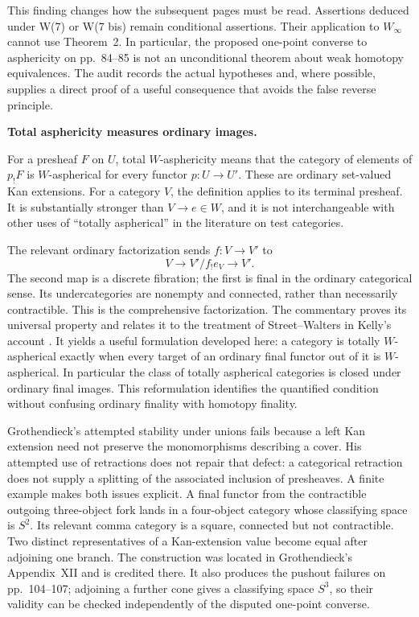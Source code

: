 This finding changes how the subsequent pages must be read. Assertions deduced under W(7) or W(7 bis) remain conditional assertions. Their application to $W_\infty$ cannot use Theorem~2. In particular, the proposed one-point converse to asphericity on pp.~84--85 is not an unconditional theorem about weak homotopy equivalences. The audit records the actual hypotheses and, where possible, supplies a direct proof of a useful consequence that avoids the false reverse principle.

\medskip
{}
\noindent\textbf{Total asphericity measures ordinary images.}

For a presheaf $F$ on $U$, total $W$-asphericity means that the category of elements of $p_!F$ is $W$-aspherical for every functor $p:U\to U'$. These are ordinary set-valued Kan extensions. For a category $V$, the definition applies to its terminal presheaf. It is substantially stronger than $V\to e\in W$, and it is not interchangeable with other uses of ``totally aspherical'' in the literature on test categories.

The relevant ordinary factorization sends $f:V\to V'$ to
\[
 V\longrightarrow V'/f_!e_V\longrightarrow V'.
\]
The second map is a discrete fibration; the first is final in the ordinary categorical sense. Its undercategories are nonempty and connected, rather than necessarily contractible. This is the comprehensive factorization. The commentary proves its universal property and relates it to the treatment of Street--Walters in Kelly's account \citep[\S4.7]{Kelly1982}. It yields a useful formulation developed here: a category is totally $W$-aspherical exactly when every target of an ordinary final functor out of it is $W$-aspherical. In particular the class of totally aspherical categories is closed under ordinary final images. This reformulation identifies the quantified condition without confusing ordinary finality with homotopy finality.

Grothendieck's attempted stability under unions fails because a left Kan extension need not preserve the monomorphisms describing a cover. His attempted use of retractions does not repair that defect: a categorical retraction does not supply a splitting of the associated inclusion of presheaves. A finite example makes both issues explicit. A final functor from the contractible outgoing three-object fork lands in a four-object category whose classifying space is $S^2$. Its relevant comma category is a square, connected but not contractible. Two distinct representatives of a Kan-extension value become equal after adjoining one branch. The construction was located in Grothendieck's Appendix~XII and is credited there. It also produces the pushout failures on pp.~104--107; adjoining a further cone gives a classifying space $S^3$, so their validity can be checked independently of the disputed one-point converse.

